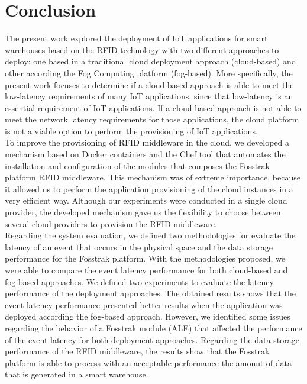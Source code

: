 
\chapter{Conclusion}
\label{chapter:conclusion}
The present work explored the deployment of \gls{IoT} applications for smart warehouses based on the
\gls{RFID} technology with two different approaches to deploy: one based in a traditional cloud
deployment approach (cloud-based) and other according the Fog Computing platform (fog-based). More
specifically, the present work focuses to determine if a cloud-based approach is able to meet the
low-latency requirements of many \gls{IoT} applications, since that low-latency is an essential
requirement of \gls{IoT} applications. If a cloud-based approach is not able to meet the network latency
requirements for those applications, the cloud platform is not a viable option to perform the
provisioning of \gls{IoT} applications.\\

To improve the provisioning of \gls{RFID} middleware in the cloud, we developed a mechanism based on
Docker containers and the Chef tool that automates the installation and configuration of the modules
that composes the Fosstrak platform \gls{RFID} middleware. This mechanism was of extreme
importance, because it allowed us to perform the application provisioning of the cloud instances in
a very efficient way. Although our experiments were conducted in a single cloud provider, the developed
mechanism gave us the flexibility to choose between several cloud providers to provision the
\gls{RFID} middleware.\\

Regarding the system evaluation, we defined two methodologies for evaluate the latency of an event that
occurs in the physical space and the data storage performance for the Fosstrak platform. With the
methodologies proposed, we were able to compare the event latency performance for both cloud-based
and fog-based approaches. We defined two experiments to evaluate the latency performance of the
deployment approaches. The obtained results shows that the event latency performance presented better
results when the application was deployed according the fog-based approach. However, we identified
some issues regarding the behavior of a Fosstrak module (\gls{ALE}) that affected the performance
of the event latency for both deployment approaches. Regarding the data storage performance of the
RFID middleware, the results show that the Fosstrak platform is able to process with an acceptable
performance the amount of data that is generated in a smart warehouse.

